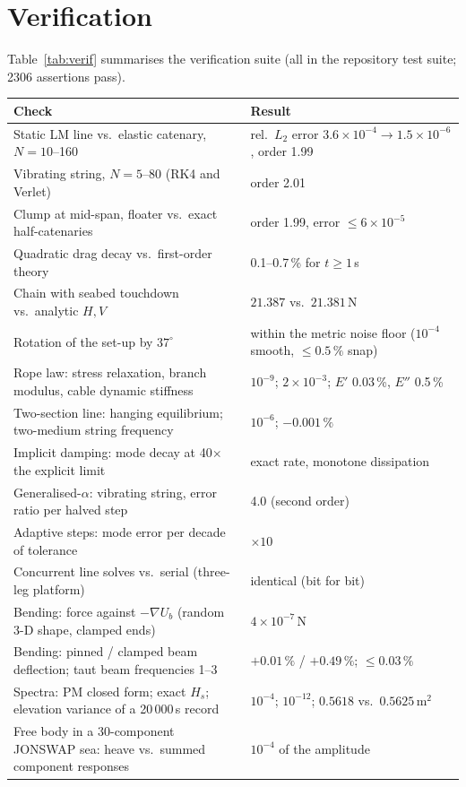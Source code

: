 \documentclass[11pt,a4paper]{article}
\begin{document}
\section{Verification}
Table~\ref{tab:verif} summarises the verification suite (all in the repository test suite; 2306 assertions pass).
\begin{table}[h]
\centering\small
\begin{tabular}{p{7.2cm}p{7cm}}
\toprule
Check & Result \\
\midrule
Static LM line vs.\ elastic catenary, $N=10$--160 & rel.\ $L_2$ error $3.6\times10^{-4}\to1.5\times10^{-6}$, order 1.99 \\
Vibrating string, $N=5$--80 (RK4 and Verlet) & order 2.01 \\
Clump at mid-span, floater vs.\ exact half-catenaries & order 1.99, error $\le 6\times10^{-5}$ \\
Quadratic drag decay vs.\ first-order theory & 0.1--0.7\,\% for $t\ge1$\,s \\
Chain with seabed touchdown vs.\ analytic $H,V$ & $21.387$ vs.\ $21.381$\,N \\
Rotation of the set-up by $37^\circ$ & within the metric noise floor ($10^{-4}$ smooth, $\le 0.5\,\%$ snap) \\
Rope law: stress relaxation, branch modulus, cable dynamic stiffness & $10^{-9}$; $2\times10^{-3}$; $E'$ 0.03\,\%, $E''$ 0.5\,\% \\
Two-section line: hanging equilibrium; two-medium string frequency & $10^{-6}$; $-0.001\,\%$ \\
Implicit damping: mode decay at 40$\times$ the explicit limit & exact rate, monotone dissipation \\
Generalised-$\alpha$: vibrating string, error ratio per halved step & 4.0 (second order) \\
Adaptive steps: mode error per decade of tolerance & $\times10$ \\
Concurrent line solves vs.\ serial (three-leg platform) & identical (bit for bit) \\
Bending: force against $-\nabla U_b$ (random 3-D shape, clamped ends) & $4\times10^{-7}$\,N \\
Bending: pinned / clamped beam deflection; taut beam frequencies 1--3 & $+0.01\,\%$ / $+0.49\,\%$; $\le0.03\,\%$ \\
Spectra: PM closed form; exact $H_s$; elevation variance of a 20\,000\,s record & $10^{-4}$; $10^{-12}$; $0.5618$ vs.\ $0.5625$\,m$^2$ \\
Free body in a 30-component JONSWAP sea: heave vs.\ summed component responses & $10^{-4}$ of the amplitude \\

\end{tabular}
\end{table}
\end{document}
